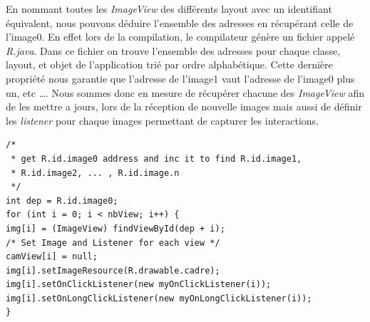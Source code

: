 En nommant toutes les \textit{ImageView} des différents layout avec un
identifiant équivalent, nous pouvons déduire l'ensemble des adresses en
récupérant celle de l'image0.
En effet lors de la compilation, le compilateur génère un fichier appelé
\textit{R.java}. Dans ce fichier on trouve l'ensemble des adresses pour chaque
classe, layout, et objet de l'application trié par ordre alphabétique. Cette
dernière propriété nous garantie que l'adresse de l'image1 vaut l'adresse de
l'image0 plus un, etc \ldots. Nous sommes donc en mesure de récupérer chacune des 
\textit{ImageView} afin de les mettre a jours, lors de la réception de nouvelle
images mais aussi de définir les \textit{listener} pour chaque images permettant 
de capturer les interactions.
\begin{changemargin}{0cm}{0cm}
\begin{lstlisting}[caption={ImageView address resolver}] 
/*
 * get R.id.image0 address and inc it to find R.id.image1,
 * R.id.image2, ... , R.id.image.n
 */
int dep = R.id.image0;
for (int i = 0; i < nbView; i++) {
img[i] = (ImageView) findViewById(dep + i);
/* Set Image and Listener for each view */
camView[i] = null;
img[i].setImageResource(R.drawable.cadre);
img[i].setOnClickListener(new myOnClickListener(i));
img[i].setOnLongClickListener(new myOnLongClickListener(i));
}
\end{lstlisting}   
\end{changemargin}

